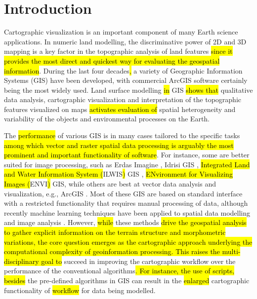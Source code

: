 \documentclass[land,article,submit,pdftex,moreauthors]{Definitions/mdpi}
\begin{document}
\section{Introduction}

Cartographic visualization is an important component of many Earth science applications. In numeric land modelling, the discriminative power of 2D and 3D mapping is a key factor in the topographic analysis of land features \hl{since it provides the most direct and quickest way for evaluating the geospatial information}. During the last four decades\hl{, }a variety of Geographic Information Systems (GIS) have been developed, with commercial ArcGIS software certainly being the most widely used. Land surface modelling \hl{in} GIS \hl{shows that }qualitative data analysis, cartographic visualization and interpretation of the topographic features visualized on maps \hl{activates evaluation of} spatial heterogeneity and variability of the objects and environmental processes on the Earth. 

The \hl{performance} of various GIS is in many cases tailored to the specific tasks \hl{among which vector and raster spatial data processing is arguably the most prominent and important functionality of software}. For instance, some are better suited for image processing, such as Erdas Imagine \cite{IWAHASHI2010202}, Idrisi GIS \cite{land10040379,AYALEW200515}, \hl{Integrated Land and Water Information System (}ILWIS\hl{)} GIS \cite{BABIKER2005127},\hl{ ENvironment for Visualizing Images (}ENVI\hl{)} GIS, while others are best at vector data analysis and visualization, e.g., ArcGIS \cite{OHTA2022108201,IKEMI2017115,IWAHASHI201229,NAKAYAMA2023110243,HANAOKA2014274}.
Most of these GIS are based on standard interface with a restricted functionality that requires manual processing of data, although recently machine learning techniques have been applied to spatial data modelling \cite{THONGTHAMMACHART2022105447,MAO2022113082} and image analysis \cite{ALIFU2020107365,CARRASCO2022277}. However, \hl{while} these methods \hl{drive the geospatial analysis to gather explicit information on the terrain structure and morphometric variations, the core question emerges as the cartographic approach underlying the computational complexity of geoinformation processing. This raises the multi-disciplinary goal to }succeed in improving the cartographic workflow over the performance of the conventional algorithms\hl{. For instance, the use of scripts, besides }the pre-defined algorithms in GIS\hl{ }can result in the \hl{enlarged} cartographic functionality of \hl{workflow} for data being modelled. 
\end{document}
